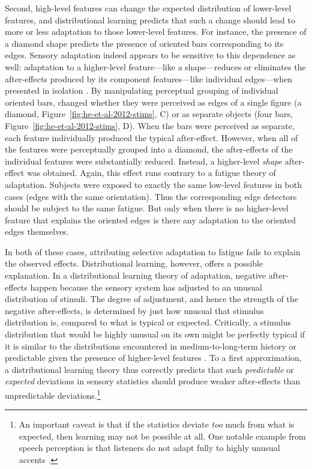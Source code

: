 Second, high-level features can change the expected distribution of lower-level features, and distributional learning predicts that such a change should lead to more or less adaptation to those lower-level features.  For instance, the presence of a diamond shape predicts the presence of oriented bars corresponding to its edges.  Sensory adaptation indeed appears to be sensitive to this dependence as well: adaptation to a higher-level feature---like a shape---reduces or eliminates the after-effects produced by its component features---like individual edges---when presented in isolation \autocite{He2012}.
By manipulating perceptual grouping of individual oriented bars, \textcite{He2012} changed whether they were perceived as edges of a single figure (a diamond, Figure~\ref{fig:he-et-al-2012-stims}, C) or as separate objects (four bars, Figure~\ref{fig:he-et-al-2012-stims}, D).  When the bars were perceived as separate, each feature individually produced the typical after-effect.  However, when all of the features were perceptually grouped into a diamond, the after-effects of the individual features were substantially reduced.  Instead, a higher-level \emph{shape} after-effect was obtained.  Again, this effect runs contrary to a fatigue theory of adaptation.  Subjects were exposed to exactly the same low-level features in both cases (edges with the same orientation). Thus the corresponding edge detectors should be subject to the same fatigue.  But only when there is no higher-level feature that explains the oriented edges is there any adaptation to the oriented edges themselves.

In both of these cases, attributing selective adaptation to fatigue fails to explain the observed effects. Distributional learning, however, offers a possible explanation. In a distributional learning theory of adaptation, negative after-effects happen because the sensory system has adjusted to an unusual distribution of stimuli.  The degree of adjustment, and hence the strength of the negative after-effects, is determined by just how unusual that stimulus distribution is, compared to what is typical or expected.  Critically, a stimulus distribution that would be highly unusual on its own might be perfectly typical if it is similar to the distributions encountered in medium-to-long-term history \autocite[e.g., as in][]{Chopin2012} or predictable given the presence of higher-level features \autocite[e.g., as in][]{He2012}.  To a first approximation, a distributional learning theory thus correctly predicts that such \emph{predictable} or \emph{expected} deviations in sensory statistics should produce weaker after-effects than unpredictable deviations.\footnote{An important caveat is that if the statistics deviate \emph{too} much from what is expected, then learning may not be possible at all.  One notable example from speech perception is that listeners do not adapt fully to highly unusual accents \protect\autocite[e.g.,][]{Idemaru2011,Sumner2011}.}

